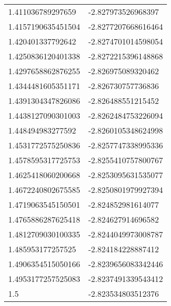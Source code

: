 \begin{supertabular}{ll}
1.411036789297659   & -2.827973526968397   \\
1.4157190635451504  & -2.8277207668616464  \\
1.420401337792642   & -2.8274701014598054  \\
1.4250836120401338  & -2.8272215396148868  \\
1.4297658862876255  & -2.826975089320462   \\
1.4344481605351171  & -2.826730757736836   \\
1.4391304347826086  & -2.826488551215452   \\
1.4438127090301003  & -2.8262484753226094  \\
1.448494983277592   & -2.8260105348624998  \\
1.4531772575250836  & -2.8257747338995336  \\
1.4578595317725753  & -2.8255410757800767  \\
1.4625418060200668  & -2.8253095631535077  \\
1.4672240802675585  & -2.8250801979927394  \\
1.4719063545150501  & -2.824852981614077   \\
1.4765886287625418  & -2.824627914696582   \\
1.4812709030100335  & -2.8244049973008787  \\
1.485953177257525   & -2.824184228887412   \\
1.4906354515050166  & -2.8239656083342446  \\
1.4953177257525083  & -2.8237491339543412  \\
1.5                 & -2.823534803512376   \\\end{supertabular}
